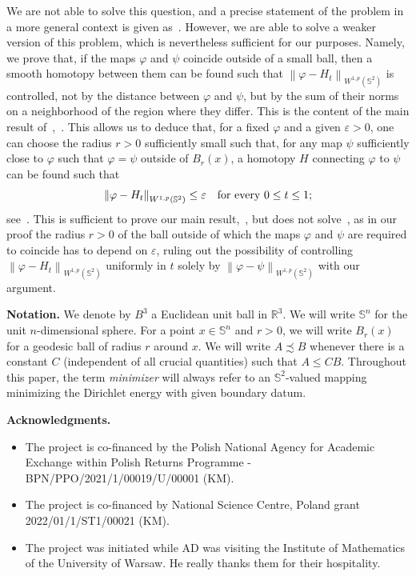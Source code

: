 \documentclass[12pt]{amsart}
\def\S{{\mathbb S}}
\newcommand{\R}{\mathbb{R}}
\newcommand{\norm}[1]{\left\|{#1}\right\|}
\numberwithin{theorem}{section} \numberwithin{equation}{section}
\newcommand{\aleq}{\precsim}
\begin{document}
We are not able to solve this question, and a precise statement of the problem in a more general context is given as~.
However, we are able to solve a weaker version of this problem, which is nevertheless sufficient for our purposes.
Namely, we prove that, if the maps \( \varphi \) and \( \psi \) coincide outside of a small ball, then a smooth homotopy between them can be found such that \( \norm{\varphi - H_{t}}_{W^{1,p}(\S^{2})} \) is controlled, not by the distance between \( \varphi \) and \( \psi \), but by the sum of their norms on a neighborhood of the region where they differ.
This is the content of the main result of~,~.
This allows us to deduce that, for a fixed \( \varphi \) and a given \( \varepsilon > 0 \), one can choose the radius \( r > 0 \) sufficiently small such that, for any map \( \psi \) sufficiently close to \( \varphi \) such that \( \varphi = \psi \) outside of \( B_{r}(x) \), a homotopy \( H \) connecting \( \varphi \) to \( \psi \) can be found such that
\[
	\norm{\varphi - H_{t}}_{W^{1,p}(\S^{2})}
	\leq
	\varepsilon
	\quad
	\text{for every \( 0 \leq t \leq 1 \);}
\]
see~.
This is sufficient to prove our main result,~, but does not solve~, as in our proof the radius \( r > 0 \) of the ball outside of which the maps \( \varphi \) and \( \psi \) are required to coincide has to depend on \( \varepsilon \), ruling out the possibility of controlling \( \norm{\varphi - H_{t}}_{W^{1,p}(\S^{2})} \) uniformly in \( t \) solely by \( \norm{\varphi - \psi}_{W^{1,p}(\S^{2})} \) with our argument.

{\bf Notation.} We denote by $B^3$ a Euclidean unit ball in $\R^3$. We will write $\S^n$ for the unit $n$-dimensional sphere. For a point $x\in \S^n$ and $r>0$, we will write $B_r(x)$ for a geodesic ball of radius $r$ around $x$. We will write $A \aleq B$ whenever there is a constant $C$ (independent of all crucial quantities) such that $A\le C B$. Throughout this paper, the term \emph{minimizer} will always refer to an $\S^2$-valued mapping minimizing the Dirichlet energy with given boundary datum.

{\bf Acknowledgments.}
\begin{itemize}
 \item The project is co-financed by the Polish National Agency for Academic Exchange within Polish Returns Programme - BPN/PPO/2021/1/00019/U/00001 (KM).
 \item The project is co-financed by National Science Centre, Poland grant 2022/01/1/ST1/00021 (KM).
 \item The project was initiated while AD was visiting the Institute of Mathematics of the University of Warsaw. He really thanks them for their hospitality.
\end{itemize}
\end{document}
